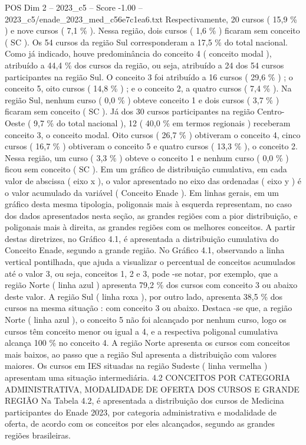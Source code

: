 \begin{textsample}{POS Dim 2 – 2023\_c5 – Score -1.00 – 2023\_c5/enade\_2023\_med\_c56e7c1ea6.txt}
Respectivamente, 20 cursos ( 15,9 \% ) e nove cursos ( 7,1 \% ).
Nessa região, dois cursos ( 1,6 \% ) ficaram sem conceito ( SC ).
Os 54 cursos da região Sul corresponderam a 17,5 \% do total nacional.
Como já indicado, houve predominância do conceito 4 ( conceito modal ), atribuído a 44,4 \% dos cursos da região, ou seja, atribuído a 24 dos 54 cursos participantes na região Sul.
O conceito 3 foi atribuído a 16 cursos ( 29,6 \% ) ; o conceito 5, oito cursos ( 14,8 \% ) ; e o conceito 2, a quatro cursos ( 7,4 \% ).
Na região Sul, nenhum curso ( 0,0 \% ) obteve conceito 1 e dois cursos ( 3,7 \% ) ficaram sem conceito ( SC ).
Já dos 30 cursos participantes na região Centro-Oeste ( 9,7 \% do total nacional ), 12 ( 40,0 \% em termos regionais ) receberam conceito 3, o conceito modal.
Oito cursos ( 26,7 \% ) obtiveram o conceito 4, cinco cursos ( 16,7 \% ) obtiveram o conceito 5 e quatro cursos ( 13,3 \% ), o conceito 2.
Nessa região, um curso ( 3,3 \% ) obteve o conceito 1 e nenhum curso ( 0,0 \% ) ficou sem conceito ( SC ).
Em um gráfico de distribuição cumulativa, em cada valor de abscissa ( eixo x ), o valor apresentado no eixo das ordenadas ( eixo y ) é o valor acumulado da variável ( Conceito Enade ).
Em linhas gerais, em um gráfico desta mesma tipologia, poligonais mais à esquerda representam, no caso dos dados apresentados nesta seção, as grandes regiões com a pior distribuição, e poligonais mais à direita, as grandes regiões com os melhores conceitos.
A partir destas diretrizes, no Gráfico 4.1, é apresentada a distribuição cumulativa do Conceito Enade, segundo a grande região.
No Gráfico 4.1, observando a linha vertical pontilhada, que ajuda a visualizar o percentual de conceitos acumulados até o valor 3, ou seja, conceitos 1, 2 e 3, pode -se notar, por exemplo, que a região Norte ( linha azul ) apresenta 79,2 \% dos cursos com conceito 3 ou abaixo deste valor.
A região Sul ( linha roxa ), por outro lado, apresenta 38,5 \% dos cursos na mesma situação : com conceito 3 ou abaixo.
Destaca -se que, a região Norte ( linha azul ), o conceito 5 não foi alcançado por nenhum curso, logo os cursos têm conceito menor ou igual a 4, e a respectiva poligonal cumulativa alcança 100 \% no conceito 4.
A região Norte apresenta os cursos com conceitos mais baixos, ao passo que a região Sul apresenta a distribuição com valores maiores.
Os cursos em IES situadas na região Sudeste ( linha vermelha ) apresentam uma situação intermediária. 4.2 CONCEITOS POR CATEGORIA ADMINISTRATIVA, MODALIDADE DE OFERTA DOS CURSOS E GRANDE REGIÃO Na Tabela 4.2, é apresentada a distribuição dos cursos de Medicina participantes do Enade 2023, por categoria administrativa e modalidade de oferta, de acordo com os conceitos por eles alcançados, segundo as grandes regiões brasileiras.

\end{textsample}
